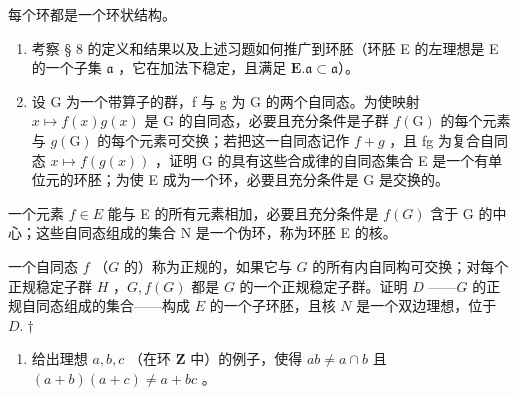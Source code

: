 每个环都是一个环状结构。

\begin{enumerate}
\def\labelenumi{(\alph{enumi})}
\item
  考察 § 8 的定义和结果以及上述习题如何推广到环胚（环胚 E 的左理想是 E 的一个子集 \(\mathfrak{a}\) ，它在加法下稳定，且满足 \(\mathbf{E}.\mathfrak{a}\subset \mathfrak{a}\)）。
\item
  设 G 为一个带算子的群，f 与 g 为 G 的两个自同态。为使映射 \(x \mapsto f(x)g(x)\) 是 G 的自同态，必要且充分条件是子群 \(f(\mathrm{G})\) 的每个元素与 \(g(\mathrm{G})\) 的每个元素可交换；若把这一自同态记作 \(f + g\) ，且 fg 为复合自同态 \(x \mapsto f(g(x))\) ，证明 G 的具有这些合成律的自同态集合 E 是一个有单位元的环胚；为使 E 成为一个环，必要且充分条件是 G 是交换的。
\end{enumerate}

一个元素 \(f \in E\) 能与 E 的所有元素相加，必要且充分条件是 \(f(G)\) 含于 G 的中心；这些自同态组成的集合 N 是一个伪环，称为环胚 E 的核。

一个自同态 \(f\) （\(G\) 的）称为正规的，如果它与 \(G\) 的所有内自同构可交换；对每个正规稳定子群 \(H\) ，\(G, f(G)\) 都是 \(G\) 的一个正规稳定子群。证明 \(D\) ——\(G\) 的正规自同态组成的集合——构成 \(E\) 的一个子环胚，且核 \(N\) 是一个双边理想，位于 \(D.†\)

\begin{enumerate}
\def\labelenumi{\arabic{enumi}.}
\setcounter{enumi}{15}
\tightlist
\item
  给出理想 \(a, b, c\) （在环 \(\mathbf{Z}\) 中）的例子，使得 \(ab \neq a \cap b\) 且 \((a + b)(a + c) \neq a + bc\) 。
\end{enumerate}

